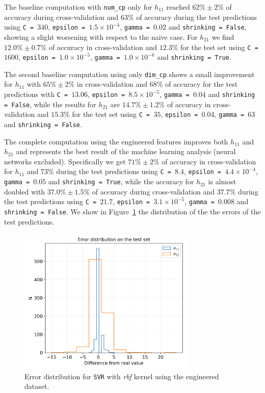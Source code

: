     The baseline computation with \texttt{num\_cp} only for $h_{11}$ reached $62\% \pm 2\%$ of accuracy during cross-validation and $63\%$ of accuracy during the test predictions using \texttt{C = $340$}, \texttt{epsilon = $1.5 \times 10^{-4}$}, \texttt{gamma = $0.02$} and \texttt{shrinking = False}, showing a slight worsening with respect to the naive case. For $h_{21}$ we find $12.0\% \pm 0.7\%$ of accuracy in cross-validation and $12.3\%$ for the test set using \texttt{C = $1600$}, \texttt{epsilon = $1.0 \times 10^{-5}$}, \texttt{gamma = $1.0 \times 10^{-6}$} and \texttt{shrinking = True}.
    
    The second baseline computation using only \texttt{dim\_cp} shows a small improvement for $h_{11}$ with $65\% \pm 2\%$ in cross-validation and $68\%$ of accuracy for the test predictions with \texttt{C = $13.06$}, \texttt{epsilon = $8.5 \times 10^{-5}$}, \texttt{gamma = $0.04$} and \texttt{shrinking = False}, while the results for $h_{21}$ are $14.7\% \pm 1.2\%$ of accuracy in cross-validation and $15.3\%$ for the test set using \texttt{C = $35$}, \texttt{epsilon = $0.04$}, \texttt{gamma = $63$} and \texttt{shrinking = False}.
    
    The complete computation using the engineered features improves both $h_{11}$ and $h_{21}$ and represents the best result of the machine learning analysis (neural networks excluded). Specifically we get $71\% \pm 2\%$ of accuracy in cross-validation for $h_{11}$ and $73\%$ during the test predictions using \texttt{C = $8.4$}, \texttt{epsilon = $4.4 \times 10^{-4}$}, \texttt{gamma = $0.05$} and \texttt{shrinking = True}, while the accuracy for $h_{21}$ is almost doubled with $37.0\% \pm 1.5\%$ of accuracy during cross-validation and $37.7\%$ during the test predictions using \texttt{C = $21.7$}, \texttt{epsilon = $3.1 \times 10^{-5}$}, \texttt{gamma = $0.008$} and \texttt{shrinking = False}. We show in Figure~\ref{fig:svr_rbf_err} the distribution of the the errors of the test predictions.
    
    \begin{figure}[t]
        \centering
        \includegraphics[width=0.75\textwidth]{tex/img/svr_rbf_error_eng.png}
        \caption{Error distribution for \texttt{SVR} with \textit{rbf} kernel using the engineered dataset.}
        \label{fig:svr_rbf_err}
    \end{figure}
    
